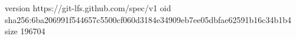 version https://git-lfs.github.com/spec/v1
oid sha256:6ba206991f544657c5500cf060d3184e34909eb7ee05dbfae62591b16c34b1b4
size 196704
